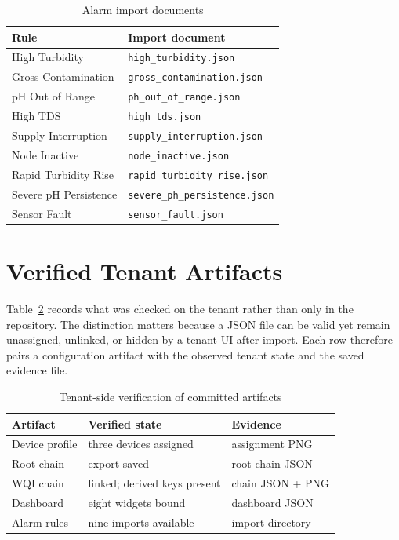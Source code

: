 \documentclass[conference]{IEEEtran}
\begin{document}
\begin{table}[t]
\caption{Alarm import documents}
\label{tab:alarm-files}
\centering
\scriptsize
\begin{tabular}{@{}ll@{}}
\toprule
Rule & Import document \\
\midrule
High Turbidity & \texttt{high\_turbidity.json} \\
Gross Contamination & \texttt{gross\_contamination.json} \\
pH Out of Range & \texttt{ph\_out\_of\_range.json} \\
High TDS & \texttt{high\_tds.json} \\
Supply Interruption & \texttt{supply\_interruption.json} \\
Node Inactive & \texttt{node\_inactive.json} \\
Rapid Turbidity Rise & \texttt{rapid\_turbidity\_rise.json} \\
Severe pH Persistence & \texttt{severe\_ph\_persistence.json} \\
Sensor Fault & \texttt{sensor\_fault.json} \\
\bottomrule
\end{tabular}
\end{table}

\section{Verified Tenant Artifacts}
\label{app:tenant}

Table~\ref{tab:tenant} records what was checked on the tenant rather than only
in the repository. The distinction matters because a JSON file can be valid yet
remain unassigned, unlinked, or hidden by a tenant UI after import. Each row
therefore pairs a configuration artifact with the observed tenant state and the
saved evidence file.

\begin{table}[t]
\caption{Tenant-side verification of committed artifacts}
\label{tab:tenant}
\centering
\scriptsize
\begin{tabular}{@{}lll@{}}
\toprule
Artifact & Verified state & Evidence \\
\midrule
Device profile & three devices assigned & assignment PNG \\
Root chain & export saved & root-chain JSON \\
WQI chain & linked; derived keys present & chain JSON + PNG \\
Dashboard & eight widgets bound & dashboard JSON \\
Alarm rules & nine imports available & import directory \\
\bottomrule
\end{tabular}
\end{table}
\end{document}
